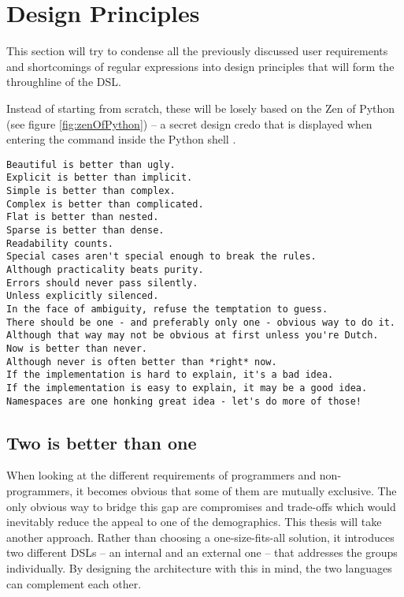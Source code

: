 \section{Design Principles} \label{sec:dslDesignPrinciples}

This section will try to condense all the previously discussed user requirements and shortcomings of regular expressions into design principles that will form the throughline of the DSL.

Instead of starting from scratch, these will be losely based on the Zen of Python (see figure \ref{fig:zenOfPython}) -- a secret design credo that is displayed when entering the command  inside the Python shell \cite{ZenOfPython}.

\begin{listingBox}[float=t!,title={The Zen of Python, by Tim Peters}, label=fig:zenOfPython]
\begin{lstlisting}[basicstyle=\footnotesize\ttfamily]
Beautiful is better than ugly. 
Explicit is better than implicit. 
Simple is better than complex. 
Complex is better than complicated. 
Flat is better than nested. 
Sparse is better than dense. 
Readability counts. 
Special cases aren't special enough to break the rules. 
Although practicality beats purity. 
Errors should never pass silently. 
Unless explicitly silenced. 
In the face of ambiguity, refuse the temptation to guess. 
There should be one - and preferably only one - obvious way to do it. 
Although that way may not be obvious at first unless you're Dutch. 
Now is better than never. 
Although never is often better than *right* now. 
If the implementation is hard to explain, it's a bad idea. 
If the implementation is easy to explain, it may be a good idea. 
Namespaces are one honking great idea - let's do more of those! 
\end{lstlisting}
\end{listingBox}

\subsection{Two is better than one} \label{sec:twoIsBetter}

When looking at the different requirements of programmers and non-programmers, it becomes obvious that some of them are mutually exclusive. The only obvious way to bridge this gap are compromises and trade-offs which would inevitably reduce the appeal to one of the demographics. This thesis will take another approach. Rather than choosing a one-size-fits-all solution, it introduces two different DSLs -- an internal and an external one -- that addresses the groups individually. By designing the architecture with this in mind, the two languages can complement each other.

